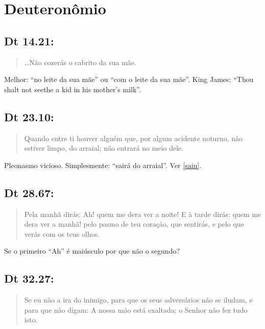 \section{Deuteronômio}
\subsection*{Dt 14.21:} 
\begin{quote}
    \small
\ldots Não cozerás o cabrito  da sua mãe.
\end{quote}

Melhor: ``no leite da sua mãe'' ou ``com o leite da sua mãe''. King James: ``Thou shalt not seethe a kid in his mother's milk''.

\subsection*{Dt 23.10:} 
\begin{quote}
    \small
Quando entre ti houver alguém que, por algum acidente noturno, não estiver limpo,  do arraial; não entrará no meio dele.
\end{quote}

Pleonasmo vicioso. Simplesmente: ``sairá do arraial''. Ver \ref{saiu}.

\subsection*{Dt 28.67:} 
\begin{quote}
    \small
Pela manhã dirás: Ah! quem me dera ver a noite! E à tarde dirás:  quem me dera ver a manhã! pelo pasmo de teu coração, que sentirás, e pelo que verás com os teus olhos.
\end{quote}

Se o primeiro ``Ah'' é maiúsculo por que não o segundo?

\subsection*{Dt 32.27:} 
 \begin{quote}
    \small
 Se eu não  a ira do inimigo, para que os seus adversários não se iludam, e para que não digam: A nossa mão está exaltada; o Senhor não fez tudo isto.
\end{quote}

